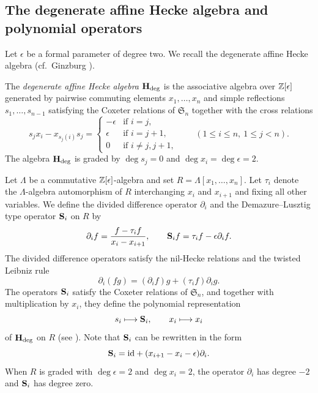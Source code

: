 \subsection{The degenerate affine Hecke algebra and polynomial operators}\label{ss:deg_hecke_algs}

Let $\epsilon$ be a formal parameter of degree two.
We recall the degenerate affine Hecke algebra (cf.\ Ginzburg \cite[\S 12]{ginzburg1998geometric}).

\begin{definition}\label{def:deg-hecke}
The \emph{degenerate affine Hecke algebra} $\mathbf H_{\mathrm{deg}}$ is the associative algebra over $\mathbb Z[\epsilon]$
generated by pairwise commuting elements $x_1,\dots,x_n$ and simple reflections $s_1,\dots,s_{n-1}$
satisfying the Coxeter relations of $\mathfrak S_n$ together with the cross relations
\[
  s_jx_i-x_{s_j(i)}s_j=
  \begin{cases}
    -\epsilon & \text{if } i=j,\\
    \epsilon & \text{if } i=j+1,\\
    0 & \text{if } i\neq j,j+1,
  \end{cases}
  \qquad (1\leq i\leq n,\ 1\leq j<n).
\]
The algebra $\mathbf H_{\mathrm{deg}}$ is graded by $\deg s_j=0$ and $\deg x_i=\deg\epsilon=2$.
\end{definition}

Let $\Lambda$ be a commutative $\mathbb Z[\epsilon]$-algebra and set $R=\Lambda[x_1,\dots,x_n]$.
Let $\tau_i$ denote the $\Lambda$-algebra automorphism of $R$ interchanging
$x_i$ and $x_{i+1}$ and fixing all other variables.
We define the divided difference operator $\partial_i$ and the
Demazure--Lusztig type operator $\mathbf S_i$ on $R$ by
\[
  \partial_i f=\frac{f-\tau_i f}{x_i-x_{i+1}},
  \qquad
  \mathbf S_i f=\tau_i f-\epsilon\partial_i f.
\]
The divided difference operators satisfy the nil-Hecke relations and the
twisted Leibniz rule
\begin{equation}\label{eq:divided_difference_leibniz}
  \partial_i(fg)=(\partial_i f)g+(\tau_i f)\partial_i g.
\end{equation}
The operators $\mathbf S_i$ satisfy the Coxeter relations of $\mathfrak S_n$, and together
with multiplication by $x_i$, they define the polynomial representation
\begin{equation}\label{eq:deg-hecke-action}
  s_i\longmapsto\mathbf S_i,\qquad
  x_i\longmapsto x_i
\end{equation}
of $\mathbf H_{\mathrm{deg}}$ on $R$ (see \cite[Proposition~12.2]{ginzburg1998geometric}).
Note that $\mathbf S_i$ can be rewritten in the form
\begin{equation}\label{eq:BS-expansion}
 \mathbf S_i=\mathrm{id}+(x_{i+1}-x_i-\epsilon)\partial_i.
\end{equation}
When $R$ is graded with $\deg\epsilon=2$ and $\deg x_i=2$, the
operator $\partial_i$ has degree $-2$ and $\mathbf S_i$ has degree zero.

